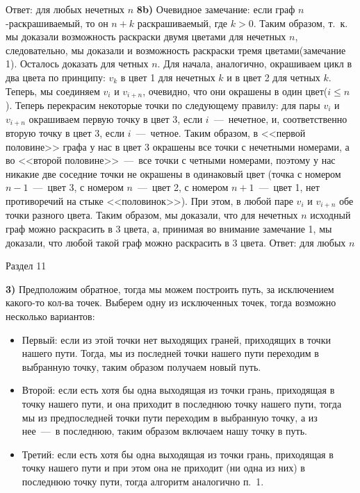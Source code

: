 \documentclass[12pt,a4paper,fleqn]{article}
\begin{document}
Ответ: для любых нечетных $n$ \newline
{\bf 8b)} Очевидное замечание: если граф $n$-раскрашиваемый, то он $n+k$ раскрашиваемый, где $k>0$. Таким образом, т.~к. мы доказали возможность раскраски двумя цветами для нечетных $n$, следовательно, мы доказали и возможность раскраски тремя цветами(замечание 1). Осталось доказать для четных $n$. Для начала, аналогично, окрашиваем цикл в два цвета по принципу: $v_k$ в цвет 1 для нечетных $k$ и в цвет 2 для четных $k$. Теперь, мы соединяем $v_i$ и $v_{i+n}$, очевидно, что они окрашены в один цвет($i\leqslant n$). Теперь перекрасим некоторые точки по следующему правилу: для пары $v_i$ и $v_{i+n}$ окрашиваем первую точку в цвет 3, если $i$~---~нечетное, и, соответственно вторую точку в цвет 3, если $i$~---~четное. Таким образом, в <<первой половине>> графа у нас в цвет 3 окрашены все точки с нечетными номерами, а во <<второй половине>>~---~все точки с четными номерами, поэтому у нас никакие две соседние точки не окрашены в одинаковый цвет (точка с номером $n-1$~---~цвет 3, с номером $n$~---~цвет 2, с номером $n+1$~---~цвет 1, нет противоречий на стыке <<половинок>>). При этом, в любой паре $v_i$ и $v_{i+n}$ обе точки разного цвета. Таким образом, мы доказали, что для нечетных $n$ исходный граф можно раскрасить в 3 цвета, а, принимая во внимание замечание 1, мы доказали, что любой такой граф можно раскрасить в 3 цвета.\newline
Ответ: для любых $n$ \newline
\begin{center}
Раздел 11
\end{center}
{\bf 3)} Предположим обратное, тогда мы можем построить путь, за исключением какого-то кол-ва точек. Выберем одну из исключенных точек, тогда возможно несколько вариантов:
\begin{itemize}
\item Первый: если из этой точки нет выходящих граней, приходящих в точки нашего пути. Тогда, мы из последней точки нашего пути переходим в выбранную точку, таким образом получаем новый путь.
\item Второй: если есть хотя бы одна выходящая из точки грань, приходящая в точку нашего пути, и она приходит в последнюю точку нашего пути, тогда мы из предпоследней точки пути переходим в выбранную точку, а из нее~---~в последнюю, таким образом включаем нашу точку в путь.
\item Третий: если есть хотя бы одна выходящая из точки грань, приходящая в точку нашего пути и при этом она не приходит (ни одна из них) в последнюю точку пути, тогда алгоритм аналогично п.~1. 
\end{itemize}   
\end{document}
